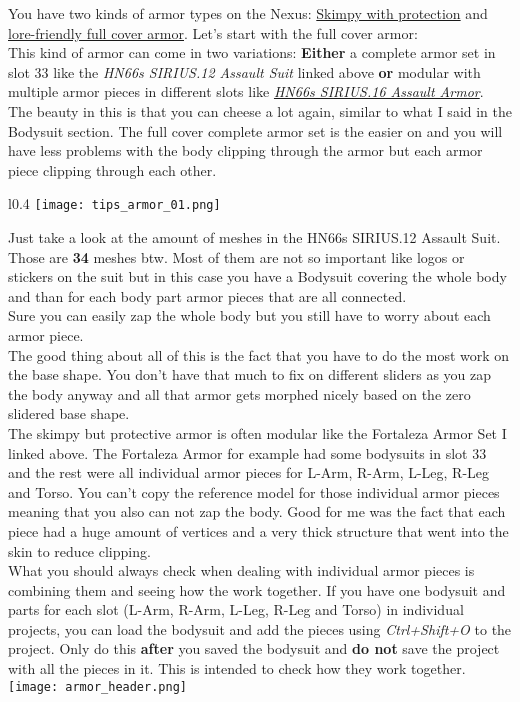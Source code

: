 You have two kinds of armor types on the Nexus: \href{https://www.nexusmods.com/fallout4/mods/10692}{Skimpy with protection} and 
\href{https://www.nexusmods.com/fallout4/mods/13572}{lore-friendly full cover armor}. Let's start with the full cover armor:\\
This kind of armor can come in two variations: \textbf{Either} a complete armor set in slot 33 like the \textit{HN66s SIRIUS.12 Assault Suit} linked 
above \textbf{or} modular with multiple armor pieces in different slots like \href{https://www.nexusmods.com/fallout4/mods/27280}{\textit{HN66s SIRIUS.16 Assault Armor}}.\\
The beauty in this is that you can cheese a lot again, similar to what I said in the Bodysuit section. The full cover complete armor 
set is the easier on and you will have less problems with the body clipping through the armor but each armor piece clipping through 
each other.
\begin{wrapfigure}[30]{l}{0.4\textwidth}
    \vspace{-12pt}
    \texttt{[image: tips\_armor\_01.png]}
\end{wrapfigure}
Just take a look at the amount of meshes in the HN66s SIRIUS.12 Assault Suit.\\
Those are \textbf{34} meshes btw. Most of them are not so important like logos or stickers on the suit but in this case you 
have a Bodysuit covering the whole body and than for each body part armor pieces that are all connected.\\
Sure you can easily zap the whole body but you still have to worry about each armor piece.\\
The good thing about all of this is the fact that you have to do the most work on the base shape. You don't have that much to fix 
on different sliders as you zap the body anyway and all that armor gets morphed nicely based on the zero slidered base shape.\\
The skimpy but protective armor is often modular like the Fortaleza Armor Set I linked above. The Fortaleza Armor for example had 
some bodysuits in slot 33 and the rest were all individual armor pieces for L-Arm, R-Arm, L-Leg, R-Leg and Torso. You can't 
copy the reference model for those individual armor pieces meaning that you also can not zap the body. Good for me was the fact 
that each piece had a huge amount of vertices and a very thick structure that went into the skin to reduce clipping.\\
What you should always check when dealing with individual armor pieces is combining them and seeing how the work together. If 
you have one bodysuit and parts for each slot (L-Arm, R-Arm, L-Leg, R-Leg and Torso) in individual projects, you can load the 
bodysuit and add the pieces using \textit{Ctrl+Shift+O} to the project. Only do this \textbf{after} you saved the bodysuit and 
\textbf{do not} save the project with all the pieces in it. This is intended to check how they work together.\\
\texttt{[image: armor\_header.png]}